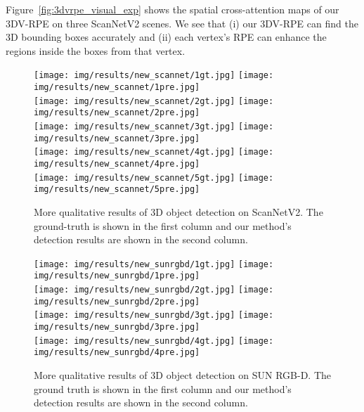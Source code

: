 \documentclass[10pt,twocolumn,letterpaper]{article}
\begin{document}
Figure~\ref{fig:3dvrpe_visual_exp} shows the spatial cross-attention maps of our 3DV-RPE on three ScanNetV2 scenes. We see that (i) our 3DV-RPE can find the 3D bounding boxes accurately and (ii) each vertex's RPE can enhance the regions inside the boxes from that vertex.


\begin{figure*}[t]
\centering
\texttt{[image: img/results/new\_scannet/1gt.jpg]}
\hspace{5pt}
\texttt{[image: img/results/new\_scannet/1pre.jpg]} \\
\texttt{[image: img/results/new\_scannet/2gt.jpg]}
\hspace{5pt}
\texttt{[image: img/results/new\_scannet/2pre.jpg]} \\
\texttt{[image: img/results/new\_scannet/3gt.jpg]}
\hspace{5pt}
\texttt{[image: img/results/new\_scannet/3pre.jpg]} \\
\texttt{[image: img/results/new\_scannet/4gt.jpg]}
\hspace{5pt}
\texttt{[image: img/results/new\_scannet/4pre.jpg]} \\
\texttt{[image: img/results/new\_scannet/5gt.jpg]}
\hspace{5pt}
\texttt{[image: img/results/new\_scannet/5pre.jpg]} \\
\caption{\small{
More qualitative results of 3D object detection on ScanNetV2. The ground-truth is shown in the first column and our method's detection results are shown in the second column.
}}
\label{fig:vis_scannet}
\end{figure*}
\begin{figure*}[t]
\centering
\texttt{[image: img/results/new\_sunrgbd/1gt.jpg]}
\hspace{5pt}
\texttt{[image: img/results/new\_sunrgbd/1pre.jpg]} \\
\texttt{[image: img/results/new\_sunrgbd/2gt.jpg]}
\hspace{5pt}
\texttt{[image: img/results/new\_sunrgbd/2pre.jpg]} \\
\texttt{[image: img/results/new\_sunrgbd/3gt.jpg]}
\hspace{5pt}
\texttt{[image: img/results/new\_sunrgbd/3pre.jpg]} \\
\texttt{[image: img/results/new\_sunrgbd/4gt.jpg]}
\hspace{5pt}
\texttt{[image: img/results/new\_sunrgbd/4pre.jpg]} \\

\caption{\small{
More qualitative results of 3D object detection on SUN RGB-D. The ground truth is shown in the first column and our method's detection results are shown in the second column.
}}
\label{fig:vis_sunrgbd}
\end{figure*}
\end{document}
